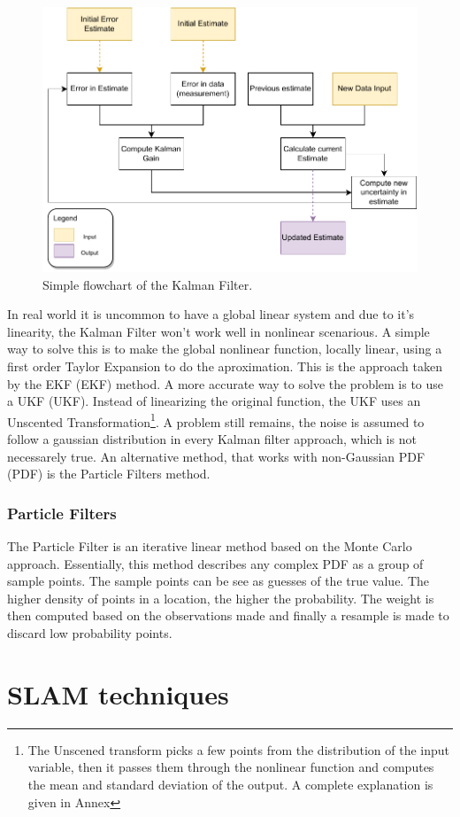 \begin{figure}[H]
    \centering
    \includegraphics[width=0.5\linewidth]{images/background/Kalman-diagram.pdf}
    \caption{Simple flowchart of the Kalman Filter.}
    \label{fig: flowchart kalman}
\end{figure}

In real world it is uncommon to have a global linear system and due to it's linearity, the Kalman Filter won't work well in nonlinear scenarious. A simple way to solve this is to make the global nonlinear function, locally linear, using a first order Taylor Expansion to do the aproximation. This is the approach taken by the \acl{EKF} (\acs*{EKF}) method. A more accurate way to solve the problem is to use a \acl*{UKF} (\acs*{UKF}). Instead of linearizing the original function, the \acs*{UKF} uses an Unscented Transformation\footnote{The Unscened transform picks a few points from the distribution of the input variable, then it passes them through the nonlinear function and computes the mean and standard deviation of the output. A complete explanation is given in Annex}. A problem still remains, the noise is assumed to follow a gaussian distribution in every Kalman filter approach, which is not necessarely true. An alternative method, that works with non-Gaussian \acl*{PDF} (\acs*{PDF}) is the Particle Filters method.

\subsubsection{Particle Filters}

The Particle Filter is an iterative linear method based on the Monte Carlo approach. Essentially, this method describes any complex \acs*{PDF} as a group of sample points. The sample points can be see as guesses of the true value. The higher density of points in a location, the higher the probability. The weight is then computed based on the observations made and finally a resample is made to discard low probability points.

\section{\acs*{SLAM} techniques}

